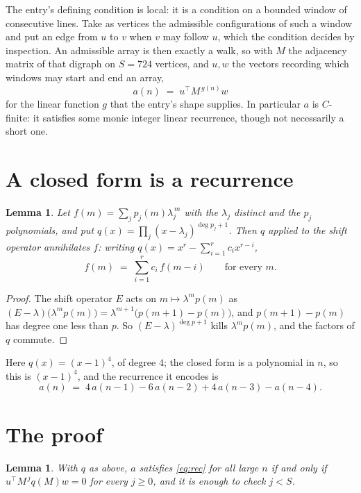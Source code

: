 \documentclass[11pt,a4paper]{article}
\theoremstyle{plain}
\newtheorem{lemma}[theorem]{Lemma}
\theoremstyle{definition}
\begin{document}
The entry's defining condition is local: it is a condition on a bounded window of consecutive lines. Take as vertices the
admissible configurations of such a window and put an edge from $u$ to $v$ when $v$ may
follow $u$, which the condition decides by inspection. An admissible array is then exactly a
walk, so with $M$ the adjacency matrix of that digraph on $S=724$ vertices, and $u,w$ the
vectors recording which windows may start and end an array,
\[
a(n)\;=\;u^{\!\top}M^{\,g(n)}w
\]
for the linear function $g$ that the entry's shape supplies. In particular $a$ is
$C$-finite: it satisfies some monic integer linear recurrence, though not necessarily a short
one.

\section{A closed form is a recurrence}

\begin{lemma}\label{lem:ann}
Let $f(m)=\sum_{j}p_j(m)\lambda_j^{\,m}$ with the $\lambda_j$ distinct and the $p_j$
polynomials, and put $q(x)=\prod_j(x-\lambda_j)^{\deg p_j+1}$. Then $q$ applied to the shift
operator annihilates $f$: writing $q(x)=x^{r}-\sum_{i=1}^{r}c_ix^{r-i}$,
\[
f(m)\;=\;\sum_{i=1}^{r}c_i\,f(m-i)\qquad\text{for every }m.
\]
\end{lemma}

\begin{proof}
The shift operator $E$ acts on $m\mapsto\lambda^{m}p(m)$ as
$(E-\lambda)\bigl(\lambda^{m}p(m)\bigr)=\lambda^{m+1}\bigl(p(m+1)-p(m)\bigr)$, and
$p(m+1)-p(m)$ has degree one less than $p$. So $(E-\lambda)^{\deg p+1}$ kills
$\lambda^{m}p(m)$, and the factors of $q$ commute.
\end{proof}

Here $q(x)=(x-1)^{4}$, of degree $4$; the closed form is a polynomial in $n$, so this is $(x-1)^{4}$, and the recurrence it encodes is
\begin{equation}\label{eq:rec}
a(n)\;=\;4\,a(n-1) - 6\,a(n-2) + 4\,a(n-3) - a(n-4).
\end{equation}

\section{The proof}

\begin{lemma}\label{lem:crit}
With $q$ as above, $a$ satisfies \eqref{eq:rec} for all large $n$ if and only if
$u^{\!\top}M^{\,j}q(M)w=0$ for every $j\ge0$, and it is enough to check $j<S$.
\end{lemma}
\end{document}
